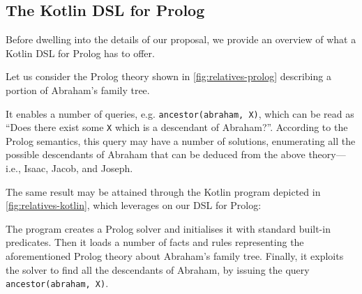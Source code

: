 \documentclass[12pt,a4paper,openright,twoside]{book}
\begin{document}
\subsection{The Kotlin DSL for Prolog}\label{ssec:dsl-overview}

Before dwelling into the details of our proposal, we provide an overview of what a Kotlin DSL for Prolog has to offer.

Let us consider the Prolog theory shown in \cref{fig:relatives-prolog} describing a portion of Abraham's family tree.
%

%
It enables a number of queries, e.g. \texttt{ancestor(a\-bra\-ham, X)}, which can be read as ``Does there exist some \texttt{X} which is a descendant of Abraham?''.
%
According to the Prolog semantics, this query may have a number of solutions, enumerating all the possible descendants of Abraham that can be deduced from the above theory---i.e., Isaac, Jacob, and Joseph.

The same result may be attained through the Kotlin program depicted in \cref{fig:relatives-kotlin}, which leverages on our DSL for Prolog:
%

%
The program creates a Prolog solver and initialises it with standard built-in predicates.
%
Then it loads a number of facts and rules representing the aforementioned Prolog theory about Abraham's family tree.
%
Finally, it exploits the solver to find all the descendants of Abraham, by issuing the query \texttt{ancestor(abraham, X)}.
\end{document}
